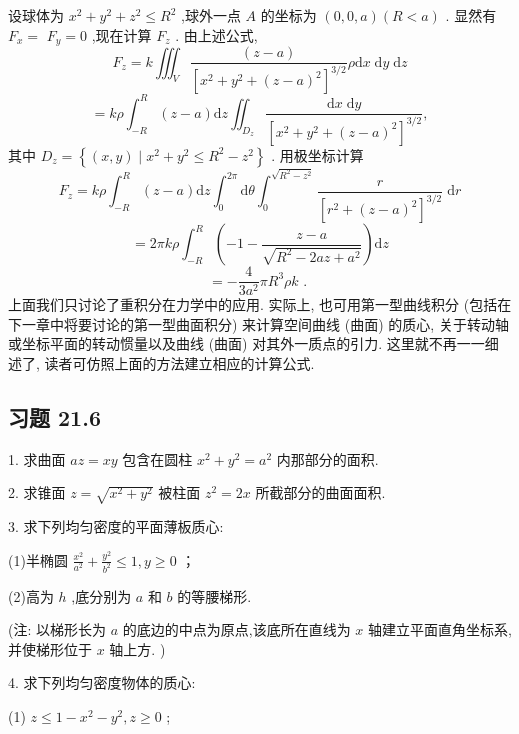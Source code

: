 \begin{solution}

\end{solution}
设球体为 \({x}^{2} + {y}^{2} + {z}^{2} \leq  {R}^{2}\) ,球外一点 \(A\) 的坐标为 \(\left( {0,0,a}\right) \left( {R < a}\right)\) . 显然有 \({F}_{x} =\)  \({F}_{y} = 0\) ,现在计算 \({F}_{z}\) . 由上述公式,
\[
{F}_{z} = k{\iiint }_{V}\frac{\left( z - a\right) }{{\left\lbrack  {x}^{2} + {y}^{2} + {\left( z - a\right) }^{2}\right\rbrack  }^{3/2}}\rho \mathrm{d}x\mathrm{\;d}y\mathrm{\;d}z
\]
\[
= {k\rho }{\int }_{-R}^{R}\left( {z - a}\right) \mathrm{d}z{\iint }_{{D}_{z}}\frac{\mathrm{d}x\mathrm{\;d}y}{{\left\lbrack  {x}^{2} + {y}^{2} + {\left( z - a\right) }^{2}\right\rbrack  }^{3/2}},
\]
其中 \({D}_{z} = \left\{  {\left( {x,y}\right)  \mid  {x}^{2} + {y}^{2} \leq  {R}^{2} - {z}^{2}}\right\}\) . 用极坐标计算
\[
{F}_{z} = {k\rho }{\int }_{-R}^{R}\left( {z - a}\right) \mathrm{d}z{\int }_{0}^{2\pi }\mathrm{d}\theta {\int }_{0}^{\sqrt{{R}^{2} - {z}^{2}}}\frac{r}{{\left\lbrack  {r}^{2} + {\left( z - a\right) }^{2}\right\rbrack  }^{3/2}}\mathrm{\;d}r
\]
\[
= {2\pi k\rho }{\int }_{-R}^{R}\left( {-1 - \frac{z - a}{\sqrt{{R}^{2} - {2az} + {a}^{2}}}}\right) \mathrm{d}z
\]
\[
=  - \frac{4}{3{a}^{2}}\pi {R}^{3}{\rho k}\text{ . }
\]
上面我们只讨论了重积分在力学中的应用. 实际上, 也可用第一型曲线积分 (包括在下一章中将要讨论的第一型曲面积分) 来计算空间曲线 (曲面) 的质心, 关于转动轴或坐标平面的转动惯量以及曲线 (曲面) 对其外一质点的引力. 这里就不再一一细述了, 读者可仿照上面的方法建立相应的计算公式.

\subsection{习题 21.6}

1. 求曲面 \({az} = {xy}\) 包含在圆柱 \({x}^{2} + {y}^{2} = {a}^{2}\) 内那部分的面积.

2. 求锥面 \(z = \sqrt{{x}^{2} + {y}^{2}}\) 被柱面 \({z}^{2} = {2x}\) 所截部分的曲面面积.

3. 求下列均匀密度的平面薄板质心:

(1)半椭圆 \(\frac{{x}^{2}}{{a}^{2}} + \frac{{y}^{2}}{{b}^{2}} \leq  1,y \geq  0\) ；

(2)高为 \(h\) ,底分别为 \(a\) 和 \(b\) 的等腰梯形.

(注: 以梯形长为 \(a\) 的底边的中点为原点,该底所在直线为 \(x\) 轴建立平面直角坐标系,并使梯形位于 \(x\) 轴上方. )

4. 求下列均匀密度物体的质心:

(1) \(z \leq  1 - {x}^{2} - {y}^{2},z \geq  0\) ;

